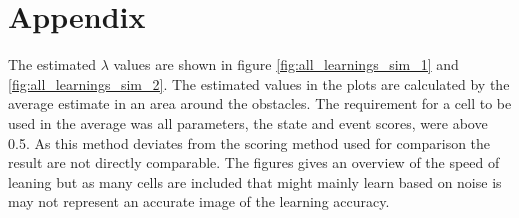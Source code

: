 \chapter{Appendix}
The estimated $\lambda$ values are shown in figure \ref{fig:all_learnings_sim_1} and \ref{fig:all_learnings_sim_2}. The estimated values in the plots are calculated by the average estimate in an area around the obstacles. The requirement for a cell to be used in the average was all parameters, the state and event scores, were above 0.5. As this method deviates from the scoring method used for comparison the result are not directly comparable.
The figures gives an overview of the speed of leaning but as many cells are included that might mainly learn based on noise is may not represent an accurate image of the learning accuracy.


